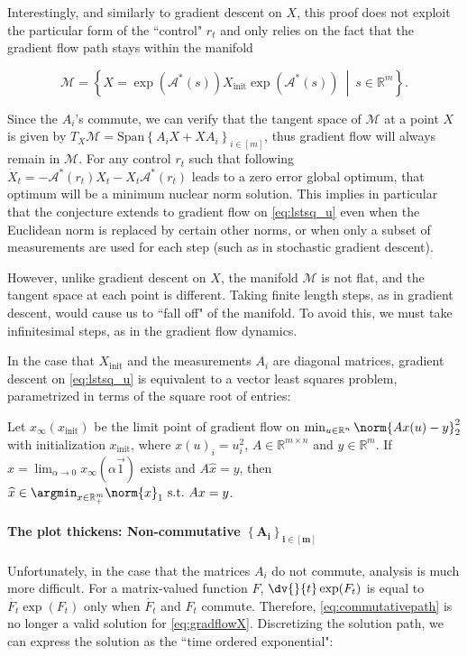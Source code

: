 Interestingly, and similarly to gradient descent on $X$, this proof does not exploit the particular form of the ``control" $r_t$ and only relies on the fact that the gradient flow path stays within the manifold

\begin{equation}\label{eq:commutativemanifold}
 \mathcal{M} = \left\{X = \exp\left( \mathcal{A}^*(s)
  \right)X_{\textrm{init}}\exp\left( \mathcal{A}^*(s) \right)\ \middle|\ s \in
  \mathbb{R}^m\right\}.
\end{equation}

 
Since the $A_i$'s commute, we can verify that the tangent space of $\mathcal{M}$ at a point $X$ is given by $T_X\mathcal{M} =
\textrm{Span}\left\{A_iX + XA_i\right\}_{i\in[m]}$, thus gradient flow will always remain in $\mathcal{M}$. 
For any control $r_t$ such that following
$\dot{X}_t = -\mathcal{A}^*(r_t)X_t - X_t\mathcal{A}^*(r_t)$ leads to a zero error global optimum, that optimum will be a minimum nuclear norm solution. This implies in particular that the conjecture extends to gradient flow on \eqref{eq:lstsq_u} even when the Euclidean norm is replaced by certain other norms, or when only a subset of measurements are used for each step (such as in stochastic gradient descent).

However, unlike gradient descent on $X$, the manifold $\mathcal{M}$ is not flat, and the tangent space at each point is different.  Taking finite length steps, as in gradient descent, would cause us to ``fall off" of the manifold.  To avoid this, we must take infinitesimal steps, as in the gradient flow dynamics.

In the case that $X_{\textrm{init}}$ and the measurements $A_i$ are diagonal matrices, gradient descent on \eqref{eq:lstsq_u} is equivalent to a vector least squares problem, parametrized in terms of the square root of entries:

\begin{corollary}
  Let $x_\infty(x_{\textrm{init}})$ be the limit point of gradient flow on
  $\min_{u\in\mathbb{R}^n} \norm{A x(u)- y}_2^2$ with initialization $x_{\textrm{init}}$, where $x(u)_i=u_i^2$, $A\in\mathbb{R}^{m \times n}$ and $y\in\mathbb{R}^m$. If $\widehat{x} = \lim_{\alpha \to 0} x_\infty(\alpha\vec{1})$
  exists and $A\widehat{x} = y$, then $\widehat{x}
  \in \argmin_{x\in\mathbb{R}^m_+} \norm{x}_1\ \textrm{s.t.}\ Ax = y$.
\end{corollary}

\paragraph{The plot thickens: Non-commutative $\mathbf{\left\{A_i\right\}_{i\in[m]}}$}
Unfortunately, in the case that the matrices $A_i$ do not commute, analysis is much more difficult. For a matrix-valued function $F$,
$\dv{}{t}\exp(F_t)$ is  equal to $\dot{F_t}\exp(F_t)$ only when
$\dot{F_t}$ and $F_t$ commute. Therefore, \eqref{eq:commutativepath} is no longer a valid solution for \eqref{eq:gradflowX}.  Discretizing the solution path, we can express the solution as the ``time ordered exponential":

